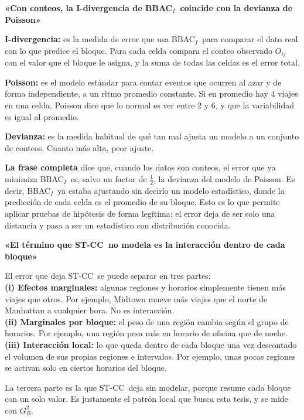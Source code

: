 \documentclass[11pt,a4paper]{article}
\newcommand{\cajainicio}[3]{\par\medskip\noindent
  \begin{lrbox}{\cajabox}\begin{minipage}{\dimexpr\linewidth-2\fboxsep-2\fboxrule\relax}%
  \textbf{\color{#1}#3}\par\smallskip}
\newcommand{\cajafin}[2]{\end{minipage}\end{lrbox}\fcolorbox{#1}{#2}{\usebox{\cajabox}}\par\medskip}
\newenvironment{nota}[1]{\cajainicio{acc}{acc!7}{#1}}{\cajafin{acc}{acc!7}}
\newcommand{\STCC}{ST-CC}
\newcommand{\BBAC}{BBAC$_I$}
\begin{document}
\begin{nota}{«Con conteos, la I-divergencia de \BBAC\ coincide con la devianza de Poisson»}
\textbf{I-divergencia:} es la medida de error que usa \BBAC\ para comparar el dato real con lo que predice el bloque. Para cada celda compara el conteo observado $O_{ij}$ con el valor que el bloque le asigna, y la suma de todas las celdas es el error total.

\textbf{Poisson:} es el modelo estándar para contar eventos que ocurren al azar y de forma independiente, a un ritmo promedio constante. Si en promedio hay 4 viajes en una celda, Poisson dice que lo normal es ver entre 2 y 6, y que la variabilidad es igual al promedio.

\textbf{Devianza:} es la medida habitual de qué tan mal ajusta un modelo a un conjunto de conteos. Cuanto más alta, peor ajuste.

\textbf{La frase completa} dice que, cuando los datos son conteos, el error que ya minimiza \BBAC\ es, salvo un factor de $\tfrac12$, la devianza del modelo de Poisson. Es decir, \BBAC\ ya estaba ajustando sin decirlo un modelo estadístico, donde la predicción de cada celda es el promedio de su bloque. Esto es lo que permite aplicar pruebas de hipótesis de forma legítima: el error deja de ser solo una distancia y pasa a ser un estadístico con distribución conocida.
\end{nota}

\begin{nota}{«El término que \STCC\ no modela es la interacción dentro de cada bloque»}
El error que deja \STCC\ se puede separar en tres partes:\\
\textbf{(i) Efectos marginales:} algunas regiones y horarios simplemente tienen más viajes que otros. Por ejemplo, Midtown mueve más viajes que el norte de Manhattan a cualquier hora. No es interacción.\\
\textbf{(ii) Marginales por bloque:} el peso de una región cambia según el grupo de horarios. Por ejemplo, una región pesa más en horario de oficina que de noche.\\
\textbf{(iii) Interacción local:} lo que queda dentro de cada bloque una vez descontado el volumen de sus propias regiones e intervalos. Por ejemplo, unas pocas regiones se activan solo en ciertos horarios del bloque.

La tercera parte es la que \STCC\ deja sin modelar, porque resume cada bloque con un solo valor. Es justamente el patrón local que busca esta tesis, y se mide con $G^2_B$.
\end{nota}
\end{document}
